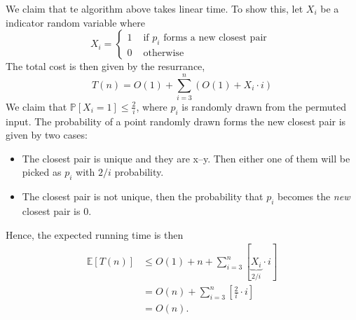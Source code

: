 \documentclass[12pt]{article}
\begin{document}
We claim that te algorithm above takes linear time. To show this, let $X_i$ be a indicator random variable where
$$X_{i} =\begin{cases}
1 &\text{ if $p_{i}$ forms a new closest pair }\\
0 &\text{ otherwise}
\end{cases}
$$
The total cost is then given by the resurrance,
$$T(n) = O(1) + \sum_{i=3}^n (O(1) + X_{i}\cdot i)$$
We claim that $\mathbb{P}[X_{i}=1] \leq \frac{2}{i}$, where $p_i$ is randomly drawn from the permuted input. The probability of a point randomly drawn forms the new closest pair is given by two cases:
\begin{itemize}
	\item The closest pair is unique and they are x--y. Then either one of them will be picked as $p_{i}$ with $2/i$ probability. 
	\item The closest pair is not unique, then the probability that $p_{i}$ becomes the \textit{new} closest pair is 0.  
\end{itemize}
Hence, the expected running time is then
\begin{align*}
\mathbb{E}[T(n)] &\leq   O(1) + n + \sum_{i=3}^n[\underbrace{X_{i}}_{2/i}\cdot i]\\
& = O(n) + \sum_{i=3}^n[\frac{2}{i}\cdot i]\\
&= O(n).
\end{align*}
\end{document}
